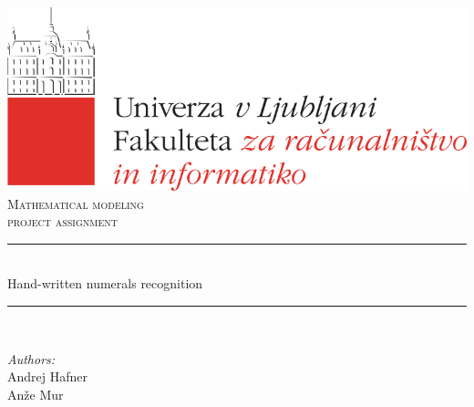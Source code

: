 \documentclass[12pt]{article}
\begin{document}
\begin{titlepage}

\newcommand{\HRule}{\rule{\linewidth}{0.5mm}} %

\center %
 

\includegraphics[scale=.2]{images/fri_logo.png}\vspace{1.8cm}\\[1cm] %
\textsc{\Large Mathematical modeling}\\[0.5cm] %
\textsc{\large project assignment}\\[0.5cm] %


\HRule \\[0.4cm]
{ \huge  Hand-written numerals recognition}\\[0.4cm] %
\HRule \\[1.5cm]
 

\begin{minipage}{0.5\textwidth}
\begin{flushleft} \large
	\emph{Authors:}\\
	Andrej Hafner\\ %
	Anže Mur\vspace{1 cm}\\ %
\end{flushleft}


\end{minipage}
\end{titlepage}
\end{document}
